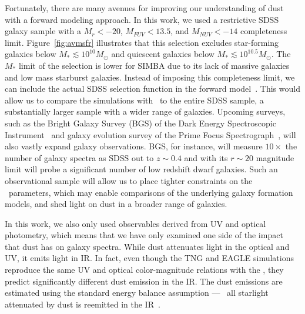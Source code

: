 Fortunately, there are many avenues for improving our understanding of dust
with a forward modeling approach. 
In this work, we used a restrictive SDSS galaxy sample with a $M_r < -20$,
$M_{FUV} < 13.5$, and $M_{NUV} < -14$ completeness limit. 
Figure~\ref{fig:avmsfr} illustrates that this selection excludes star-forming
galaxies below $M_* \lesssim 10^{10}M_\odot$ and quiescent
galaxies below $M_* \lesssim 10^{10.5}M_\odot$. 
The $M_*$ limit of the selection is lower for SIMBA due to its lack of massive
galaxies and low mass starburst galaxies. 
Instead of imposing this completeness limit, we can include the actual SDSS
selection function in the forward 
model~\citep[\eg~][]{dickey2020}. 
This would allow us to compare the simulations with \eda~to the entire SDSS
sample, a substantially larger sample with a wider range of galaxies. 
Upcoming surveys, such as the Bright Galaxy Survey (BGS) of the Dark Energy
Spectroscopic Instrument~\citep[DESI;][]{desicollaboration2016, ruiz-macias2020} 
and galaxy evolution survey of the Prime Focus
Spectrograph~\citep[PFS;][]{takada2014,tamura2016}, will also vastly expand galaxy
observations. 
BGS, for instance, will measure $10\times$ the number of galaxy spectra as
SDSS out to $z\sim0.4$  and with its $r\sim20$ magnitude limit will probe
a significant number of low redshift dwarf galaxies. 
Such an observational sample will allow us to place tighter constraints on
the \eda~parameters, which may enable comparisons of the underlying galaxy
formation models, and shed light on dust in a broader range of galaxies.
    
In this work, we also only used observables derived from UV and optical
photometry, which means that we have only examined one side of the impact
that dust has on galaxy spectra.
While dust attenuates light in the optical and UV, it emits light in
IR. In fact, even though the TNG and EAGLE simulations reproduce the same UV and
optical color-magnitude relations with the \eda, they predict significantly 
different dust emission in the IR. 
The dust emissions are estimated using the standard energy balance assumption
--- \ie~all starlight attenuated by dust is reemitted in the IR~\citep{dacunha2008}. 

